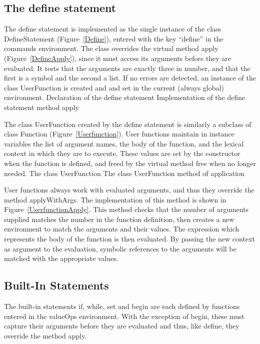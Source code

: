 \subsection{The define statement}

The define statement is implemented as the single instance of the class {\sf
    DefineStatement} (Figure~\ref{Define}), entered with the key ``define'' in
the {\sf commands} environment.  The class overrides the virtual method {\sf
    apply} (Figure~\ref{DefineApply}), since it must access its arguments before
they are evaluated.  It tests that the arguments are exactly three in number,
and that the first is a symbol and the second a list.  If no errors are
detected, an instance of the class {\sf UserFunction} is created and and set in
the current (always global) environment.
%
{Declaration of the {\sf define} statement}
%
{Implementation of the {\sf define} statement method {\sf apply}}

The class {\sf UserFunction} created by the define statement is similarly a
subclass of class {\sf Function} (Figure~\ref{Userfunction}).  User functions
maintain in instance variables the list of argument names, the body of the
function, and the lexical context in which they are to execute.  These values
are set by the constructor when the function is defined, and freed by the
virtual method {\sf free} when no longer needed.
%
{The class {\sf UserFunction}}
%
{The class {\sf UserFunction} method of application}

User functions always work with evaluated arguments, and thus they override the
method {\sf applyWithArgs}.  The implementation of this method is shown in
Figure~\ref{UserfunctionApply}.  This method checks that the number of arguments
supplied matches the number in the function definition, then creates a new
environment to match the arguments and their values.  The expression which
represents the body of the function is then evaluated.  By passing the new
context as argument to the evaluation, symbolic references to the arguments will
be matched with the appropriate values.

\subsection{Built-In Statements}

The built-in statements {\sf if, while, set} and {\sf begin} are each defined by
functions entered in the {\sf valueOps} environment.  With the exception of {\sf
    begin}, these must capture their arguments before they are evaluated and
thus, like {\sf define}, they override the method {\sf apply}.

